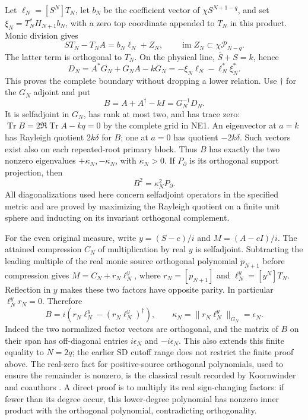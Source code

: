 \documentclass[11pt]{article}
\newcommand{\Tr}{\operatorname{Tr}}
\newcommand{\norm}[1]{\lVert#1\rVert}
\begin{document}
Let $\ell_N=[S^N]T_N$, let $b_N$ be the coefficient vector of
$\chi S^{N+1-q}$, and set $\xi_N=T_N^*H_{N+1}b_N$, with a zero
top coordinate appended to $T_N$ in this product. Monic division gives
\[
S T_N-T_N A=b_N\ell_N+Z_N,
\qquad \operatorname{im}Z_N\subset\chi\mathcal P_{N-q}.
\]
The latter term is orthogonal to $T_N$. On the physical line,
$\overline S+S=k$, hence
\begin{equation}\tag{NE2}
D_N=A^*G_N+G_NA-kG_N=-\xi_N\ell_N-\ell_N^*\xi_N^*.
\end{equation}
This proves the complete boundary without dropping a lower relation.
Use $\dagger$ for the $G_N$ adjoint and put
\begin{equation}\tag{NE3}
B=A+A^\dagger-kI=G_N^{-1}D_N.
\end{equation}
It is selfadjoint in $G_N$, has rank at most two, and has trace zero:
$\Tr B=2\Re\Tr A-kq=0$ by the complete grid in NE1.
An eigenvector at $a=k$ has Rayleigh quotient $2k\delta$ for $B$;
one at $a=0$ has quotient $-2k\delta$. Such vectors exist also on each
repeated-root primary block. Thus $B$ has exactly the two nonzero
eigenvalues $+\kappa_N,-\kappa_N$, with $\kappa_N>0$. If $P_\partial$
is its orthogonal support projection, then
\begin{equation}\tag{NE4}
B^2=\kappa_N^2P_\partial.
\end{equation}
All diagonalizations used here concern selfadjoint operators in the
specified metric and are proved by maximizing the Rayleigh quotient
on a finite unit sphere and inducting on its invariant orthogonal
complement.

For the even original measure, write $y=(S-c)/i$ and $M=(A-cI)/i$.
The attained compression $C_N$ of multiplication by real $y$ is
selfadjoint. Subtracting the leading multiple of the real monic source
orthogonal polynomial $p_{N+1}$ before compression gives
$M=C_N+r_N\ell_N^{y}$, where $r_N=[p_{N+1}]$ and
$\ell_N^{y}=[y^N]T_N$. Reflection in $y$ makes these two factors have
opposite parity. In particular $\ell_N^{y}r_N=0$. Therefore
\begin{equation}\tag{NE5}
B=i(r_N\ell_N^{y}-(r_N\ell_N^{y})^\dagger),\qquad
\kappa_N=\norm{r_N\ell_N^{y}}_{G_N}=\epsilon_N.
\end{equation}
Indeed the two normalized factor vectors are orthogonal, and the
matrix of $B$ on their span has off-diagonal entries $i\epsilon_N$
and $-i\epsilon_N$. This also extends this finite equality to $N=2q$;
the earlier SD cutoff range does not restrict the finite proof above.
The real-zero fact for positive-source orthogonal polynomials, used
to ensure the remainder is nonzero, is the classical result recorded
by Koornwinder and coauthors \cite[\S18.2(vi)]{DLMF}. A direct proof is
to multiply its real sign-changing factors: if fewer than its degree
occur, this lower-degree polynomial has nonzero inner product with
the orthogonal polynomial, contradicting orthogonality.
\end{document}
